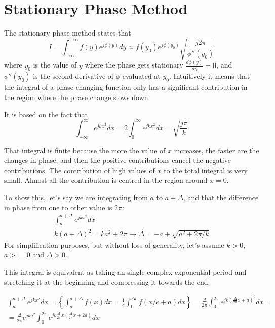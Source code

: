 \chapter{Stationary Phase Method}
The stationary phase method states that
\begin{equation}
I = \int_{-\infty}^{+\infty} f(y) e^{j\phi(y)} dy \approx f(y_0) e^{j\phi(y_0)} \sqrt{\frac{j 2\pi}{\phi''(y_0)}}
\end{equation}
where $y_0$ is the value of $y$ where the phase gets stationary $\frac{d\phi(y)}{dy} = 0$, and $\phi''(y_0)$ is the second derivative of $\phi$ evaluated at $y_0$. Intuitively it means that the integral of a phase changing function only has a significant contribution in the region where the phase change slows down.

It is based on the fact that
\begin{equation}
\int_{-\infty}^{\infty} e^{j k x^2} dx = 2 \int_{0}^{\infty} e^{j k x^2} dx = \sqrt{\frac{j\pi}{k}}
\end{equation}

That integral is finite because the more the value of $x$ increases, the faster are the changes in phase, and then the positive contributions cancel the negative contributions. The contribution of high values of $x$ to the total integral is very small. Almost all the contribution is centred in the region around $x=0$.

To show this, let's say we are integrating from $a$ to $a + \Delta$, and that the difference in phase from one to other value is $2\pi$:
\begin{gather}
\int_{a}^{a + \Delta} e^{j k x^2} dx \\
k(a + \Delta)^2 = ka^2 + 2\pi \rightarrow \Delta = -a + \sqrt{a^2 + 2\pi/k} \label{DeltaRelation}
\end{gather}
For simplification purposes, but without loss of generality, let's assume $k>0$, $a >= 0$ and $\Delta > 0$.

This integral is equivalent as taking an single complex exponential period and stretching it at the beginning and compressing it towards the end.

\begin{multline}
	\int_{a}^{a + \Delta} e^{j k x^2} dx = \left\{ \int_{a}^{a + \Delta} f(x) dx = \frac{1}{c} \int_{0}^{\Delta c} f(x/c + a) dx \right\}= \frac{\Delta}{2\pi} \int_{0}^{2\pi} e^{j k (\frac{\Delta}{2\pi}x + a)^2} dx = \\
	= \frac{\Delta}{2\pi} e^{jka^2} \int_{0}^{2\pi} e^{j k \frac{\Delta}{2\pi}x (\frac{\Delta}{2\pi}x + 2a)} dx
	\label{mainEq}
\end{multline}

